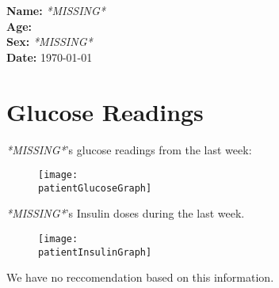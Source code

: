 \documentclass{article}
\newcommand{\missingText}{\emph{*MISSING*}}
\providecommand{\patientName}{\missingText}
\providecommand{\patientSex}{\missingText}
\newcommand{\noRecommendation}{We have no reccomendation based on this information.}
\providecommand{\patientReccomendation}{\noRecommendation}
\providecommand{\patientGlucoseGraph}{}
\providecommand{\patientInsulinGraph}{}
\begin{document}
    \textbf{Name: }\patientName \\
    \textbf{Age: }\patientAge \\
    \textbf{Sex: }\patientSex \\
    \textbf{Date: }\today\\
    
    \section{Glucose Readings}
    \patientName{'s} glucose readings from the last week:
    \begin{figure}
        \texttt{[image: \\patientGlucoseGraph]}
    \end{figure}
    \patientName{'s} Insulin doses during the last week.
    \begin{figure}
        \texttt{[image: \\patientInsulinGraph]}
    \end{figure}
    \patientReccomendation
\end{document}
